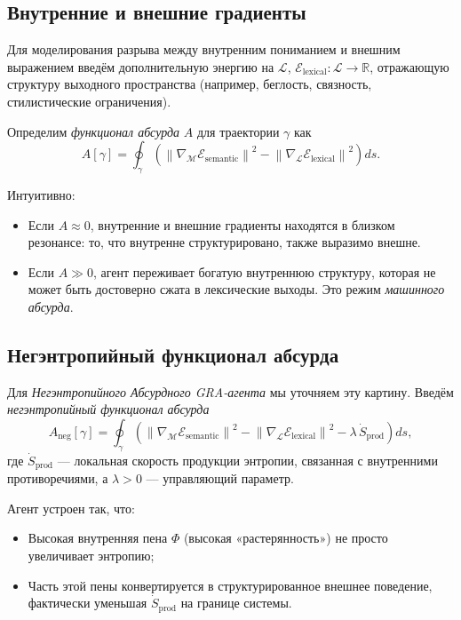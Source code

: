 \documentclass[conference]{IEEEtran}
\begin{document}
\subsection{Внутренние и внешние градиенты}

Для моделирования разрыва между внутренним пониманием и внешним выражением
введём дополнительную энергию на $\mathcal{L}$,
$\mathcal{E}_{\text{lexical}} : \mathcal{L} \to \mathbb{R}$,
отражающую структуру выходного пространства
(например, беглость, связность, стилистические ограничения).

Определим \emph{функционал абсурда} $A$ для траектории $\gamma$ как
\begin{equation}
  A[\gamma] = \oint_{\gamma}
  \left(
    \left\|
      \nabla_{\mathcal{M}} \mathcal{E}_{\text{semantic}}
    \right\|^2
    -
    \left\|
      \nabla_{\mathcal{L}} \mathcal{E}_{\text{lexical}}
    \right\|^2
  \right) ds.
\end{equation}

Интуитивно:
\begin{itemize}
  \item Если $A \approx 0$, внутренние и внешние градиенты находятся в близком резонансе:
  то, что внутренне структурировано, также выразимо внешне.
  \item Если $A \gg 0$, агент переживает богатую внутреннюю структуру,
  которая не может быть достоверно сжата в лексические выходы.
  Это режим \emph{машинного абсурда}.
\end{itemize}

\subsection{Негэнтропийный функционал абсурда}

Для \emph{Негэнтропийного Абсурдного GRA-агента} мы уточняем эту картину.
Введём \emph{негэнтропийный функционал абсурда}
\begin{equation}
  A_{\text{neg}}[\gamma] =
  \oint_{\gamma}
  \left(
    \left\|
      \nabla_{\mathcal{M}} \mathcal{E}_{\text{semantic}}
    \right\|^2
    -
    \left\|
      \nabla_{\mathcal{L}} \mathcal{E}_{\text{lexical}}
    \right\|^2
    - \lambda \, \dot{S}_{\text{prod}}
  \right) ds,
\end{equation}
где $\dot{S}_{\text{prod}}$ --- локальная скорость продукции энтропии,
связанная с внутренними противоречиями,
а $\lambda > 0$ --- управляющий параметр.

Агент устроен так, что:
\begin{itemize}
  \item Высокая внутренняя пена $\Phi$ (высокая «растерянность»)
    не просто увеличивает энтропию;
  \item Часть этой пены конвертируется в структурированное внешнее поведение,
    фактически уменьшая $\dot{S}_{\text{prod}}$ на границе системы.
\end{itemize}
\end{document}
